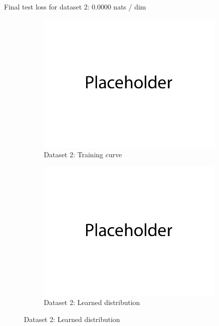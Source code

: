 \documentclass{article}
\begin{document}
\begin{enumerate}[(a)]
\begin{figure}[H]
\begin{subfigure}{0.45\textwidth}
    \end{subfigure}
\end{figure}
Final test loss for dataset 2: 0.0000  nats / dim
\begin{figure}[H]
    \centering
    \begin{subfigure}{0.45\textwidth}
        \centering
        \includegraphics[width=\textwidth]{figures/q1_a_dset2_train_plot.png}
        \caption{Dataset 2: Training curve}
    \end{subfigure}
    \hspace{0.2in}
    \begin{subfigure}{0.45\textwidth}
        \centering
        \includegraphics[width=\textwidth]{figures/q1_a_dset2_learned_dist.png}
        \caption{Dataset 2: Learned distribution}
    \end{subfigure}
\end{figure}


\end{enumerate}
\end{document}

